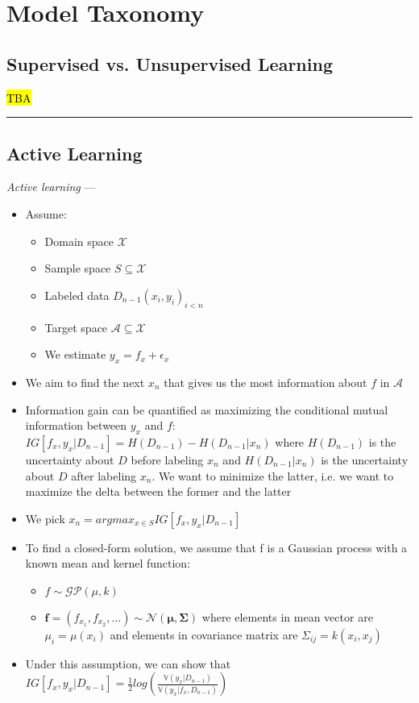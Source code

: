 \section{Model Taxonomy}
\subsection*{Supervised vs. Unsupervised Learning}
\hl{TBA}

{\color{black}\hrule height 0.001mm}

\subsection*{Active Learning}

\emph{Active learning} ---
\begin{itemize}
    \item Assume:
    \begin{itemize}
        \item Domain space $\mathcal{X}$ 
        \item Sample space $S \subseteq \mathcal{X}$
        \item Labeled data $D_{n-1} {(x_i, y_i)}_{i < n}$
        \item Target space $\mathcal{A} \subseteq \mathcal{X}$
        \item We estimate $y_x = f_x + \epsilon_x$
    \end{itemize}
    \item We aim to find the next $x_n$ that gives us the most information about $f$ in $\mathcal{A}$
    \item Information gain can be quantified as maximizing the conditional mutual information between $y_x$ and $f$: $IG [ f_x, y_x | D_{n-1} ] = H(D_{n-1}) - H(D_{n-1} | x_n)$ where $H(D_{n-1})$ is the uncertainty about $D$ before labeling $x_n$ and $H(D_{n-1} | x_n)$ is the uncertainty about $D$ after labeling $x_n$. We want to minimize the latter, i.e. we want to maximize the delta between the former and the latter
    \item We pick $x_n = argmax_{x \in S} IG [ f_x, y_x | D_{n-1} ]$ 
    \item To find a closed-form solution, we assume that f is a Gaussian process with a known mean and kernel function:
    \begin{itemize}
        \item $f \sim \mathcal{G}\mathcal{P} (\mu, k)$
        \item $\boldsymbol{f} = (f_{x_1}, f_{x_2}, ...) \sim \mathcal{N} (\boldsymbol{\mu}, \boldsymbol{\Sigma})$ where elements in mean vector are $\mu_i = \mu(x_i)$ and elements in covariance matrix are $\Sigma_{ij} = k(x_i,x_j)$
    \end{itemize}
    \item Under this assumption, we can show that $IG [ f_x, y_x | D_{n-1} ] = \frac{1}{2} log( \frac{ \mathbb{V} (y_x | D_{n-1}) }{ \mathbb{V} (y_x | f_x, D_{n-1}) } )$
\end{itemize}


